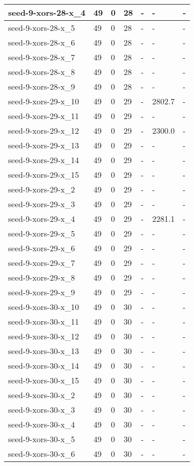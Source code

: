 \begin{scriptsize}
\begin{longtable}{|p{5cm}|l|l|l|l|l|l|}
seed-9-xors-28-x\_4&49&0&28&-&-&- \\ \hline 
seed-9-xors-28-x\_5&49&0&28&-&-&- \\ \hline 
seed-9-xors-28-x\_6&49&0&28&-&-&- \\ \hline 
seed-9-xors-28-x\_7&49&0&28&-&-&- \\ \hline 
seed-9-xors-28-x\_8&49&0&28&-&-&- \\ \hline 
seed-9-xors-28-x\_9&49&0&28&-&-&- \\ \hline 
seed-9-xors-29-x\_10&49&0&29&-&2802.7&- \\ \hline 
seed-9-xors-29-x\_11&49&0&29&-&-&- \\ \hline 
seed-9-xors-29-x\_12&49&0&29&-&2300.0&- \\ \hline 
seed-9-xors-29-x\_13&49&0&29&-&-&- \\ \hline 
seed-9-xors-29-x\_14&49&0&29&-&-&- \\ \hline 
seed-9-xors-29-x\_15&49&0&29&-&-&- \\ \hline 
seed-9-xors-29-x\_2&49&0&29&-&-&- \\ \hline 
seed-9-xors-29-x\_3&49&0&29&-&-&- \\ \hline 
seed-9-xors-29-x\_4&49&0&29&-&2281.1&- \\ \hline 
seed-9-xors-29-x\_5&49&0&29&-&-&- \\ \hline 
seed-9-xors-29-x\_6&49&0&29&-&-&- \\ \hline 
seed-9-xors-29-x\_7&49&0&29&-&-&- \\ \hline 
seed-9-xors-29-x\_8&49&0&29&-&-&- \\ \hline 
seed-9-xors-29-x\_9&49&0&29&-&-&- \\ \hline 
seed-9-xors-30-x\_10&49&0&30&-&-&- \\ \hline 
seed-9-xors-30-x\_11&49&0&30&-&-&- \\ \hline 
seed-9-xors-30-x\_12&49&0&30&-&-&- \\ \hline 
seed-9-xors-30-x\_13&49&0&30&-&-&- \\ \hline 
seed-9-xors-30-x\_14&49&0&30&-&-&- \\ \hline 
seed-9-xors-30-x\_15&49&0&30&-&-&- \\ \hline 
seed-9-xors-30-x\_2&49&0&30&-&-&- \\ \hline 
seed-9-xors-30-x\_3&49&0&30&-&-&- \\ \hline 
seed-9-xors-30-x\_4&49&0&30&-&-&- \\ \hline 
seed-9-xors-30-x\_5&49&0&30&-&-&- \\ \hline 
seed-9-xors-30-x\_6&49&0&30&-&-&- \\ \hline 

\end{longtable}
\end{scriptsize}
